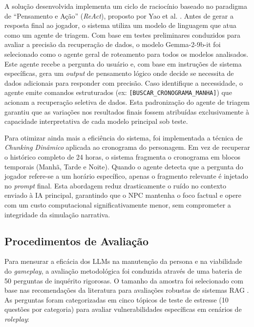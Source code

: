 \documentclass[12pt]{article}
\begin{document}
A solução desenvolvida implementa um ciclo de raciocínio baseado no paradigma de ``Pensamento e Ação'' (\textit{ReAct}), proposto por Yao et al. \cite{yao2022react}. Antes de gerar a resposta final ao jogador, o sistema utiliza um modelo de linguagem que atua como um agente de triagem. Com base em testes preliminares conduzidos para avaliar a precisão da recuperação de dados, o modelo Gemma-2-9b-it foi selecionado como o agente geral de roteamento para todos os modelos analisados. Este agente recebe a pergunta do usuário e, com base em instruções de sistema específicas, gera um \textit{output} de pensamento lógico onde decide se necessita de dados adicionais para responder com precisão. Caso identifique a necessidade, o agente emite comandos estruturados (ex: \texttt{[BUSCAR\_CRONOGRAMA\_MANHA]}) que acionam a recuperação seletiva de dados. Esta padronização do agente de triagem garantiu que as variações nos resultados finais fossem atribuídas exclusivamente à capacidade interpretativa de cada modelo principal sob teste.

Para otimizar ainda mais a eficiência do sistema, foi implementada a técnica de \textit{Chunking Dinâmico} aplicada ao cronograma do personagem. Em vez de recuperar o histórico completo de 24 horas, o sistema fragmenta o cronograma em blocos temporais (Manhã, Tarde e Noite). Quando o agente detecta que a pergunta do jogador refere-se a um horário específico, apenas o fragmento relevante é injetado no \textit{prompt} final. Esta abordagem reduz drasticamente o ruído no contexto enviado à IA principal, garantindo que o NPC mantenha o foco factual e opere com um custo computacional significativamente menor, sem comprometer a integridade da simulação narrativa.

\subsection{Procedimentos de Avaliação}

Para mensurar a eficácia dos LLMs na manutenção da persona e na viabilidade do \textit{gameplay}, a avaliação metodológica foi conduzida através de uma bateria de 50 perguntas de inquérito rigorosas. O tamanho da amostra foi selecionado com base nas recomendações da literatura para avaliações robustas de sistemas RAG \cite{es2023ragas}. As perguntas foram categorizadas em cinco tópicos de teste de estresse (10 questões por categoria) para avaliar vulnerabilidades específicas em cenários de \textit{roleplay}:
\end{document}
